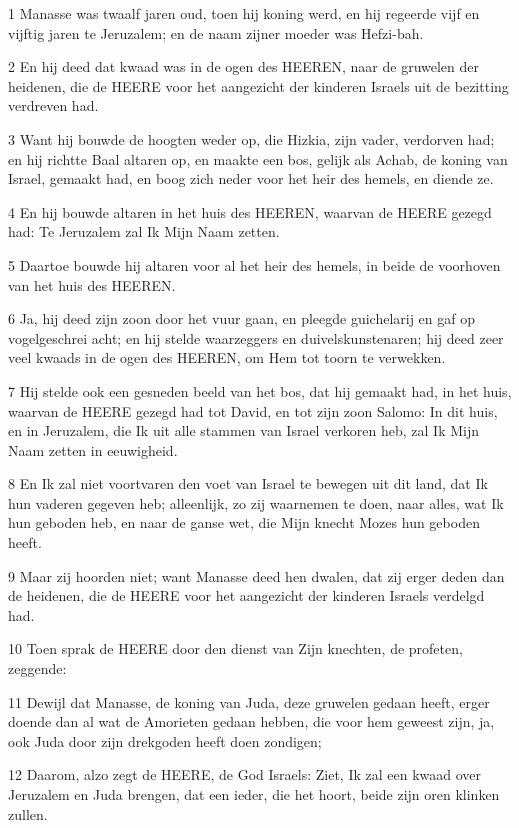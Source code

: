 \par 1 Manasse was twaalf jaren oud, toen hij koning werd, en hij regeerde vijf en vijftig jaren te Jeruzalem; en de naam zijner moeder was Hefzi-bah.
\par 2 En hij deed dat kwaad was in de ogen des HEEREN, naar de gruwelen der heidenen, die de HEERE voor het aangezicht der kinderen Israels uit de bezitting verdreven had.
\par 3 Want hij bouwde de hoogten weder op, die Hizkia, zijn vader, verdorven had; en hij richtte Baal altaren op, en maakte een bos, gelijk als Achab, de koning van Israel, gemaakt had, en boog zich neder voor het heir des hemels, en diende ze.
\par 4 En hij bouwde altaren in het huis des HEEREN, waarvan de HEERE gezegd had: Te Jeruzalem zal Ik Mijn Naam zetten.
\par 5 Daartoe bouwde hij altaren voor al het heir des hemels, in beide de voorhoven van het huis des HEEREN.
\par 6 Ja, hij deed zijn zoon door het vuur gaan, en pleegde guichelarij en gaf op vogelgeschrei acht; en hij stelde waarzeggers en duivelskunstenaren; hij deed zeer veel kwaads in de ogen des HEEREN, om Hem tot toorn te verwekken.
\par 7 Hij stelde ook een gesneden beeld van het bos, dat hij gemaakt had, in het huis, waarvan de HEERE gezegd had tot David, en tot zijn zoon Salomo: In dit huis, en in Jeruzalem, die Ik uit alle stammen van Israel verkoren heb, zal Ik Mijn Naam zetten in eeuwigheid.
\par 8 En Ik zal niet voortvaren den voet van Israel te bewegen uit dit land, dat Ik hun vaderen gegeven heb; alleenlijk, zo zij waarnemen te doen, naar alles, wat Ik hun geboden heb, en naar de ganse wet, die Mijn knecht Mozes hun geboden heeft.
\par 9 Maar zij hoorden niet; want Manasse deed hen dwalen, dat zij erger deden dan de heidenen, die de HEERE voor het aangezicht der kinderen Israels verdelgd had.
\par 10 Toen sprak de HEERE door den dienst van Zijn knechten, de profeten, zeggende:
\par 11 Dewijl dat Manasse, de koning van Juda, deze gruwelen gedaan heeft, erger doende dan al wat de Amorieten gedaan hebben, die voor hem geweest zijn, ja, ook Juda door zijn drekgoden heeft doen zondigen;
\par 12 Daarom, alzo zegt de HEERE, de God Israels: Ziet, Ik zal een kwaad over Jeruzalem en Juda brengen, dat een ieder, die het hoort, beide zijn oren klinken zullen.
